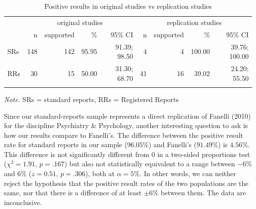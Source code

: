 \documentclass[british,,jou,floatsintext]{apa6}
\begin{document}
\begin{table}[tbp]

\begin{center}
\begin{threeparttable}

\caption{\label{tab:unnamed-chunk-4}Positive results in original studies vs replication studies}

\begin{tabular}{lrrrrrrrr}
\toprule
 & \multicolumn{4}{c}{original studies} & \multicolumn{4}{c}{replication studies} \\
\cmidrule(r){2-5} \cmidrule(r){6-9}
 & n & supported & \% & 95\% CI & n & supported & \% & 95\% CI\\
\midrule
SRs & 148 & 142 & 95.95 & 91.39; 98.50 & 4 & 4 & 100.00 & 39.76; 100.00\\
RRs & 30 & 15 & 50.00 & 31.30; 68.70 & 41 & 16 & 39.02 & 24.20; 55.50\\
\bottomrule
\addlinespace
\end{tabular}

\begin{tablenotes}[para]
\normalsize{\textit{Note.} SRs = standard reports, RRs = Registered Reports}
\end{tablenotes}

\end{threeparttable}
\end{center}

\end{table}

Since our standard-reports sample represents a direct replication of Fanelli (2010) for the discipline Psychiatry \& Psychology, another interesting question to ask is how our results compare to Fanelli's.
The difference between the positive result rate for standard reports in our sample (\(96.05\%\)) and Fanelli's (\(91.49\%\)) is \(4.56\%\). This difference is not significantly different from 0 in a two-sided proportions test (\(\chi^2 = 1.91\), \(p= .167\)) but also not statistically equivalent to a range between \(-6\%\) and \(6\%\) (\(z = 0.51\), \(p= .306\)), both at \(\alpha = 5\%\).
In other words, we can neither reject the hypothesis that the positive result rates of the two populations are the same, nor that there is a difference of at least \(\pm 6\%\) between them.
The data are inconclusive.
\end{document}
